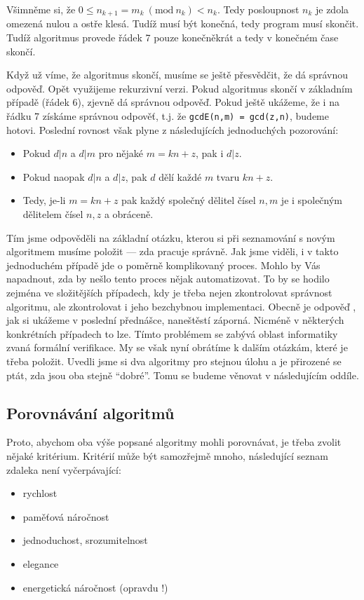 Všimněme si, že $0\leq n_{k+1} = m_k\ (\mbox{mod}\ n_k) <n_k$. Tedy posloupnost $n_k$ je zdola omezená
nulou a ostře klesá. Tudíž musí být konečná, tedy program musí skončit. Tudíž algoritmus provede řádek 7 pouze konečněkrát a tedy v konečném
čase skončí. 

Když už víme, že algoritmus skončí, musíme se ještě přesvědčit, že dá správnou odpověď.  Opět využijeme rekurzivní verzi.  Pokud algoritmus
skončí v základním případě (řádek 6), zjevně dá správnou odpověď. Pokud ještě ukážeme, že i na řádku 7 získáme správnou odpověť, t.j. že {\tt gcdE(n,m) = gcd(z,n)},
budeme hotovi. Poslední rovnost však plyne z následujících jednoduchých pozorování:

\begin{itemize}
 \item Pokud $d|n$ a $d|m$ pro nějaké $m = kn + z$, pak i $d|z$.
 \item Pokud naopak $d|n$ a $d|z$, pak $d$ dělí každé $m$ tvaru $ kn + z$.
 \item Tedy, je-li $m = kn + z$ pak každý společný dělitel čísel $n,m$ je i společným dělitelem čísel $n,z$ a obráceně.
\end{itemize}

Tím jsme odpověděli na základní otázku, kterou si při seznamování s novým algoritmem musíme položit --- zda pracuje správně. Jak jsme viděli, i v takto jednoduchém
případě jde o poměrně komplikovaný proces. Mohlo by Vás napadnout, zda by nešlo tento proces nějak automatizovat. To by se hodilo zejména ve složitějších případech,
kdy je třeba nejen zkontrolovat správnost algoritmu, ale zkontrolovat i jeho bezchybnou implementaci. Obecně je odpověď , jak si ukážeme v poslední přednášce, naneštěstí
záporná. Nicméně v některých konkrétních případech to lze. Tímto problémem se zabývá oblast informatiky zvaná formální verifikace.  My se však nyní obrátíme k dalším
otázkám, které je třeba položit. Uvedli jsme si dva algoritmy pro stejnou úlohu a je přirozené se ptát, zda jsou oba stejně ``dobré''.  Tomu se budeme věnovat v následujícím oddíle.

\subsection*{Porovnávání algoritmů} 
Proto, abychom oba výše popsané algoritmy mohli porovnávat, je třeba zvolit nějaké kritérium. Kritérií může být samozřejmě mnoho,
následující seznam zdaleka není vyčerpávající:

\begin{itemize}
 \item rychlost
 \item paměťová náročnost
 \item jednoduchost, srozumitelnost
 \item elegance
 \item energetická náročnost (opravdu !)
\end{itemize}

